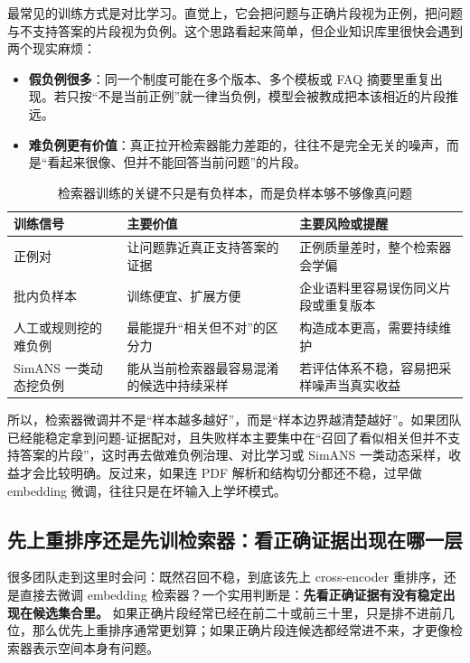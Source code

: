 最常见的训练方式是对比学习。直觉上，它会把问题与正确片段视为正例，把问题与不支持答案的片段视为负例。这个思路看起来简单，但企业知识库里很快会遇到两个现实麻烦：
\begin{itemize}
  \item \textbf{假负例很多}：同一个制度可能在多个版本、多个模板或 FAQ 摘要里重复出现。若只按“不是当前正例”就一律当负例，模型会被教成把本该相近的片段推远。
  \item \textbf{难负例更有价值}：真正拉开检索器能力差距的，往往不是完全无关的噪声，而是“看起来很像、但并不能回答当前问题”的片段。
\end{itemize}

\begin{table}[H]
\centering
\small
\begin{tabularx}{\textwidth}{>{\raggedright\arraybackslash}p{3cm}>{\raggedright\arraybackslash}p{3.2cm}>{\raggedright\arraybackslash}X}
\toprule
\textbf{训练信号} & \textbf{主要价值} & \textbf{主要风险或提醒} \\
\midrule
正例对 & 让问题靠近真正支持答案的证据 & 正例质量差时，整个检索器会学偏 \\
批内负样本 & 训练便宜、扩展方便 & 企业语料里容易误伤同义片段或重复版本 \\
人工或规则挖的难负例 & 最能提升“相关但不对”的区分力 & 构造成本更高，需要持续维护 \\
SimANS 一类动态挖负例 & 能从当前检索器最容易混淆的候选中持续采样 & 若评估体系不稳，容易把采样噪声当真实收益 \\
\bottomrule
\end{tabularx}
\caption{检索器训练的关键不只是有负样本，而是负样本够不够像真问题}
\label{tab:dense-retrieval-training}
\end{table}

所以，检索器微调并不是“样本越多越好”，而是“样本边界越清楚越好”。如果团队已经能稳定拿到问题-证据配对，且失败样本主要集中在“召回了看似相关但并不支持答案的片段”，这时再去做难负例治理、对比学习或 SimANS 一类动态采样，收益才会比较明确。反过来，如果连 PDF 解析和结构切分都还不稳，过早做 embedding 微调，往往只是在坏输入上学坏模式。

\subsection{先上重排序还是先训检索器：看正确证据出现在哪一层}
很多团队走到这里时会问：既然召回不稳，到底该先上 cross-encoder 重排序，还是直接去微调 embedding 检索器？一个实用判断是：\textbf{先看正确证据有没有稳定出现在候选集合里。} 如果正确片段经常已经在前二十或前三十里，只是排不进前几位，那么优先上重排序通常更划算；如果正确片段连候选都经常进不来，才更像检索器表示空间本身有问题。

